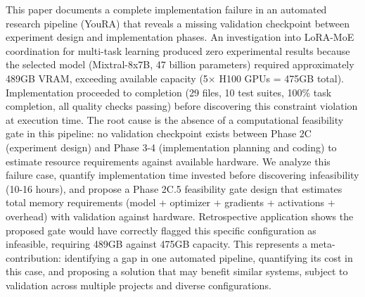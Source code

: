 
This paper documents a complete implementation failure in an automated research pipeline (YouRA) that reveals a missing validation checkpoint between experiment design and implementation phases. An investigation into LoRA-MoE coordination for multi-task learning produced zero experimental results because the selected model (Mixtral-8x7B, 47 billion parameters) required approximately 489GB VRAM, exceeding available capacity (5× H100 GPUs = 475GB total). Implementation proceeded to completion (29 files, 10 test suites, 100\% task completion, all quality checks passing) before discovering this constraint violation at execution time. The root cause is the absence of a computational feasibility gate in this pipeline: no validation checkpoint exists between Phase 2C (experiment design) and Phase 3-4 (implementation planning and coding) to estimate resource requirements against available hardware. We analyze this failure case, quantify implementation time invested before discovering infeasibility (10-16 hours), and propose a Phase 2C.5 feasibility gate design that estimates total memory requirements (model + optimizer + gradients + activations + overhead) with validation against hardware. Retrospective application shows the proposed gate would have correctly flagged this specific configuration as infeasible, requiring 489GB against 475GB capacity. This represents a meta-contribution: identifying a gap in one automated pipeline, quantifying its cost in this case, and proposing a solution that may benefit similar systems, subject to validation across multiple projects and diverse configurations.
